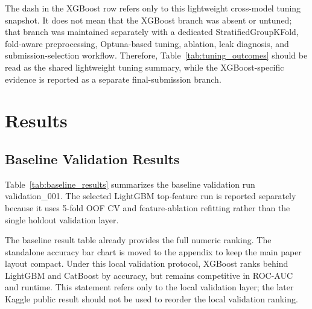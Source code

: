 \documentclass[conference]{IEEEtran}
\renewcommand{\texttt}[1]{\textnormal{#1}}
\begin{document}
\noindent The dash in the XGBoost row refers only to this lightweight cross-model tuning snapshot. It does not mean
that the XGBoost branch was absent or untuned; that branch was maintained separately with a dedicated
\texttt{StratifiedGroupKFold}, fold-aware preprocessing, Optuna-based tuning, ablation, leak diagnosis, and
submission-selection workflow. Therefore, Table~\ref{tab:tuning_outcomes} should be read as the shared lightweight
tuning summary, while the XGBoost-specific evidence is reported as a separate final-submission branch.

\section{Results}
\subsection{Baseline Validation Results}
Table~\ref{tab:baseline_results} summarizes the baseline validation run \texttt{validation\_001}. The selected LightGBM top-feature run is reported separately because it uses 5-fold OOF CV and feature-ablation refitting rather than the single holdout validation layer.

\begin{table}[t]
\caption{Baseline local validation results}
\label{tab:baseline_results}
\centering
\footnotesize
{}
\end{table}

The baseline result table already provides the full numeric ranking. The standalone accuracy bar chart is moved to
the appendix to keep the main paper layout compact. Under this local validation protocol, XGBoost ranks behind LightGBM and CatBoost by accuracy, but remains competitive in ROC-AUC and runtime. This statement refers only to the local validation layer; the later Kaggle public result should not be used to reorder the local validation ranking.
\end{document}
